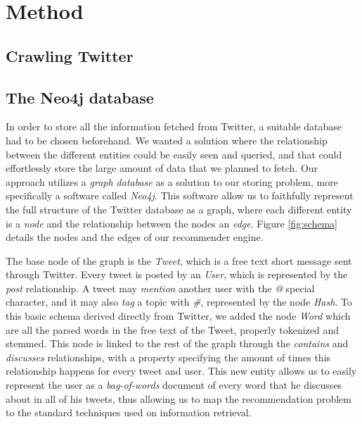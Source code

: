 \section{Method}
\label{sec:method}

\subsection{Crawling Twitter}

\subsection{The Neo4j database}

In order to store all the information fetched from Twitter, a suitable database had to be chosen beforehand. We wanted a solution where the relationship between the different entities could be easily seen and queried, and that could effortlessly store the large amount of data that we planned to fetch. Our approach utilizes a \emph{graph database} as a solution to our storing problem, more specifically a software called \emph{Neo4j}\cite{neo4j}. This software allow us to faithfully represent the full structure of the Twitter database as a graph, where each different entity is a \emph{node} and the relationship between the nodes an \emph{edge}. Figure \ref{fig:schema} details the nodes and the edges of our recommender engine.

The base node of the graph is the \emph{Tweet}, which is a free text short message sent through Twitter. Every tweet is posted by an \emph{User}, which is represented by the \emph{post} relationship. A tweet may \emph{mention} another user with the \emph{@} special character, and it may also \emph{tag} a topic with \emph{\#}, represented by the node \emph{Hash}. To this basic schema derived directly from Twitter, we added the node \emph{Word} which are all the parsed words in the free text of the Tweet, properly tokenized and stemmed. This node is linked to the rest of the graph through the \emph{contains} and \emph{discusses} relationships, with a property specifying the amount of times this relationship happens for every tweet and user. This new entity allows us to easily represent the user as a \emph{bag-of-words} document of every word that he discusses about in all of his tweets, thus allowing us to map the recommendation problem to the standard techniques used on information retrieval. 

